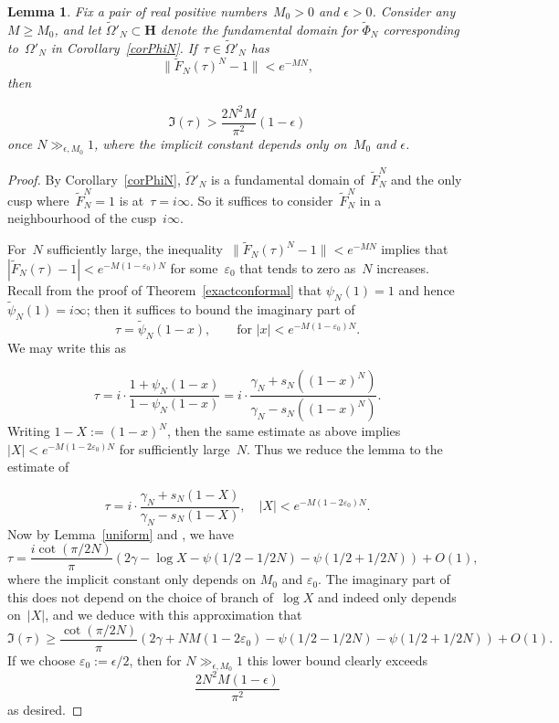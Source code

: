 \documentclass[10pt]{amsart}
\def\wPhi{\widetilde{\Phi}}
\def\wF{\widetilde{F}}
\def\wpsi{\widetilde{\psi}}
\def\wOm{\widetilde{\Omega}}
\newtheorem{lemma}[subsubsection]{Lemma}
\theoremstyle{remark}
\numberwithin{equation}{subsection}
\def\numequation{\addtocounter{subsubsection}{1}\begin{equation}}
\def\H{\mathbf{H}}
\begin{document}
 \begin{lemma} \label{fnearone} Fix a pair of real positive numbers~$M_0 > 0$ and $\epsilon > 0$. Consider any $M\geq M_0$, and let $\wOm'_N\subset \H$ denote the fundamental domain for $\wPhi_N$ corresponding to~$\Omega'_N$ in Corollary~\ref{corPhiN}.
 If~$\tau \in \wOm'_N$ has
 $$\|\wF_N(\tau)^N - 1\| < e^{-MN},$$
  then 
 \numequation  \label{horo}
\Im(\tau) >  \frac{2 N^2 M}{\pi^2} (1 - \epsilon)
\end{equation}
once $N\gg_{\epsilon, M_0} 1$, where the implicit constant depends only on~$M_0$ and $\epsilon$.
\end{lemma}

\begin{proof}
By Corollary~\ref{corPhiN}, $\wOm'_N$ is a fundamental domain of~$\wF^N_N$ and the only cusp where~$\wF_N^N = 1$
is at~$\tau=i \infty$.
So it suffices to consider~$\wF^N_N$ in a neighbourhood of the cusp~$i \infty$.

For~$N$ sufficiently large, the inequality~$ \|\wF_N(\tau)^N - 1\| < e^{-MN}$
implies that~$|\wF_N(\tau) - 1| < e^{-M(1 - \varepsilon_0) N}$
for some~$\varepsilon_0$ that tends to zero as~$N$ increases. 
Recall from the proof of Theorem~\ref{exactconformal} that $\psi_N(1)=1$ and hence $\wpsi_N(1)=i\infty$; then it suffices to bound the imaginary part of
$$
\tau = \wpsi_N(1 - x), \qquad \text{for } |x| < e^{-M(1-\varepsilon_0)N}.
$$
We may write this as
\numequation
\tau = i \cdot \frac{1 + \psi_N(1-x)}{1 - \psi_N(1-x)}
= i  \cdot \frac{\gamma_N + s_N((1-x)^N)} {\gamma_N - s_N((1-x)^N)}.
\end{equation}
Writing $1-X := (1- x)^N$, then the same estimate as above implies~$|X| < e^{-M(1 - 2\varepsilon_0)N}$
for sufficiently large~$N$. Thus we reduce the lemma to the estimate of
\numequation
\tau = i  \cdot \frac{\gamma_N + s_N(1-X)} {\gamma_N - s_N(1-X)}, \quad |X| < e^{-M(1- 2\varepsilon_0)N}.
\end{equation}
Now by Lemma~\ref{uniform} and \cite[6.3.7]{AS}, we have
$$\tau =  \frac{i \cot(\pi/2N)}{\pi} \left(2 \gamma - \log{X} - \psi(1/2 - 1/2N) - \psi(1/2 + 1/2N) \right) + O(1),$$
where the implicit constant only depends on $M_0$ and $\varepsilon_0$.
The imaginary part of this does not depend on the choice of branch of~$\log{X}$ and indeed only
depends on~$|X|$, and we deduce with this approximation that
$$
\Im(\tau) \ge
 \frac{ \cot(\pi/2N)}{\pi} \left(2 \gamma + NM (1-2 \varepsilon_0) - \psi(1/2 - 1/2N) - \psi(1/2 + 1/2N) \right) +O(1).
$$
If we choose $\varepsilon_0 := \epsilon/2$, then for $N \gg_{\epsilon, M_0} 1$ this lower bound clearly exceeds 
$$
\frac{2 N^2 M (1-\epsilon)}{\pi^2}
$$
as desired.
\end{proof}
\end{document}
